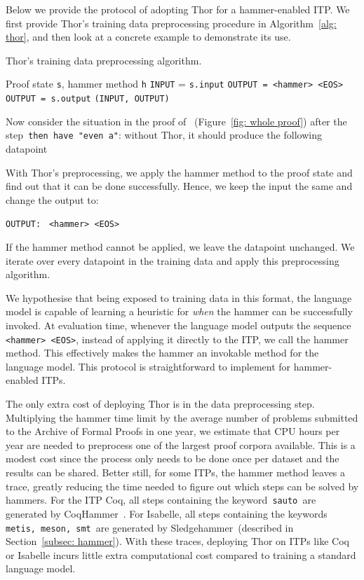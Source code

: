 \documentclass{article}
\begin{document}
Below we provide the protocol of adopting Thor for a hammer-enabled ITP. We first provide Thor's training data preprocessing procedure in Algorithm~\ref{alg: thor}, and then look at a concrete example to demonstrate its use.
\begin{algorithm}
\caption{Thor's training data preprocessing algorithm.}
\label{alg: thor}
\begin{algorithmic}
\Require Proof state \texttt{s}, hammer method \texttt{h}
\State \texttt{INPUT} = \texttt{s.input}
 
    \State \texttt{OUTPUT = <hammer> <EOS>}
\Else {}
    \State \texttt{OUTPUT = s.output}
\EndIf
\State \Return \texttt{(INPUT, OUTPUT)}
\end{algorithmic}
\end{algorithm}

Now consider the situation in the proof of ~(Figure~\ref{fig: whole proof}) after the step\texttt{ then have "even a"}: without Thor, it should produce the following datapoint

With Thor's preprocessing, we apply the hammer method to the proof state and find out that it can be done successfully. Hence, we keep the input the same and change the output to:
\begin{center}
    \texttt{OUTPUT: \quad} \texttt{<hammer> <EOS>}
\end{center}
If the hammer method cannot be applied, we leave the datapoint unchanged. We iterate over every datapoint in the training data and apply this preprocessing algorithm.

We hypothesise that being exposed to training data in this format, the language model is capable of learning a heuristic for \emph{when} the hammer can be successfully invoked.
At evaluation time, whenever the language model outputs the sequence\texttt{ <hammer> <EOS>}, instead of applying it directly to the ITP, we call the hammer method. This effectively makes the hammer an invokable method for the language model.
This protocol is straightforward to implement for hammer-enabled ITPs.


The only extra cost of deploying Thor is in the data preprocessing step. 
Multiplying the hammer time limit by the average number of problems submitted to the Archive of Formal Proofs in one year, we estimate that  CPU hours per year are needed to preprocess one of the largest proof corpora available. This is a modest cost since the process only needs to be done once per dataset and the results can be shared.
Better still, for some ITPs, the hammer method leaves a trace, greatly reducing the time needed to figure out which steps can be solved by hammers. For the ITP Coq, all steps containing the keyword\texttt{ sauto }are generated by CoqHammer~\citep{coqhammer}. For Isabelle, all steps containing the keywords\texttt{ metis, meson, smt }are generated by Sledgehammer~(described in Section~\ref{subsec: hammer}). With these traces, deploying Thor on ITPs like Coq or Isabelle incurs little extra computational cost compared to training a standard language model. 
\end{document}
